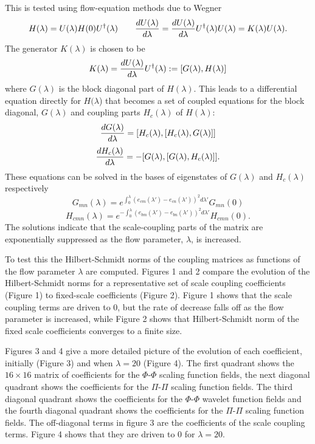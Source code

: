 \documentclass[aps,prc,reprint,showpacs,groupedaddress,onecolumn]{revtex4}
\def\beq{\begin{equation}}
\def\eeq{\end{equation}}
\begin{document}
This is tested \cite{tracie} using flow-equation methods due to Wegner \cite{wegner}
\cite{glazek9}
\[
H(\lambda) = U(\lambda)H(0)U^{\dagger}(\lambda) 
\qquad 
{dU(\lambda) \over d\lambda} = {dU(\lambda) \over d\lambda}
U^{\dagger}(\lambda) U(\lambda) =
K(\lambda) U(\lambda) .
\]
The generator $K(\lambda)$ is chosen to be
\[
K(\lambda) =  {dU(\lambda) \over d\lambda}
U^{\dagger}(\lambda) := [G(\lambda),H(\lambda)]
\]
where $G(\lambda)$ is the block diagonal part of $H(\lambda)$.   This
leads to a differential equation directly for $H(\lambda$) that 
becomes a set of coupled equations for the block diagonal, $G(\lambda)$ and 
coupling parts $H_c(\lambda)$ of $H(\lambda)$:
\[
{dG(\lambda)\over d\lambda} =
[H_c(\lambda),[H_c (\lambda),G(\lambda)]]
\]
\[
{dH_c(\lambda)\over d\lambda} =
-[G(\lambda),[G(\lambda),H_c(\lambda)]] .
\]
These equations can be solved in the bases of eigenstates of $G(\lambda)$ 
and $H_{c}(\lambda)$ respectively 
\beq
G_{mn}(\lambda) = e^{\int_0^\lambda (e_{cm}(\lambda')-e_{cn}(\lambda'))^2 d\lambda'}
G_{mn}(0)
\label{eq:7}
\eeq
\beq
H_{cmn}(\lambda) = e^{-\int_0^\lambda (e_{bm}(\lambda')-e_{bn}(\lambda'))^2 d\lambda'}
H_{cmn}(0).
\label{eq:8}
\eeq
The solutions indicate that the scale-coupling parts of the matrix 
are exponentially suppressed as the flow parameter, $\lambda$, is increased. 

To test this the Hilbert-Schmidt norms of the coupling matrices as
functions of the flow parameter $\lambda$ are computed.  Figures 1 and 2
compare the evolution of the Hilbert-Schmidt norms for a 
representative set of scale
coupling coefficients (Figure 1) to fixed-scale coefficients
(Figure 2).  Figure 1 shows that the scale coupling terms are driven
to 0, but the rate of decrease falls off as the flow parameter is
increased, while Figure 2 shows that Hilbert-Schmidt norm of the 
fixed scale coefficients converges to a finite size. 

Figures 3 and 4 give a more detailed picture of the evolution of each
coefficient, initially (Figure 3) and when $\lambda=20$ (Figure 4).  The first
quadrant shows the $16 \times 16$ matrix of coefficients for the
$\Phi$-$\Phi$ scaling function fields, the next diagonal quadrant shows
the coefficients for the $\Pi$-$\Pi$ scaling function fields.  The third
diagonal quadrant shows the coefficients for the $\Phi$-$\Phi$ wavelet
function fields and the fourth diagonal quadrant shows the
coefficients for the $\Pi$-$\Pi$ scaling function fields.  The 
off-diagonal terms in figure 3 are the coefficients of the scale coupling
terms.  Figure 4 shows that they are driven to 0 for $\lambda=20$.
 
\end{document}
